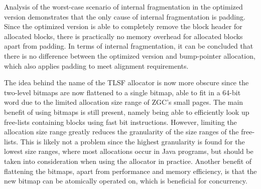 Analysis of the worst-case scenario of internal fragmentation in the optimized version demonstrates that the only cause of internal fragmentation is padding. Since the optimized version is able to completely remove the block header for allocated blocks, there is practically no memory overhead for allocated blocks apart from padding. In terms of internal fragmentation, it can be concluded that there is no difference between the optimized version and bump-pointer allocation, which also applies padding to meet alignment requirements.

The idea behind the name of the TLSF allocator is now more obscure since the two-level bitmaps are now flattened to a single bitmap, able to fit in a 64-bit word due to the limited allocation size range of ZGC's small pages. The main benefit of using bitmaps is still present, namely being able to efficiently look up free-lists containing blocks using fast bit instructions. However, limiting the allocation size range greatly reduces the granularity of the size ranges of the free-lists. This is likely not a problem since the highest granularity is found for the lowest size ranges, where most allocations occur in Java programs, but should be taken into consideration when using the allocator in practice. Another benefit of flattening the bitmaps, apart from performance and memory efficiency, is that the new bitmap can be atomically operated on, which is beneficial for concurrency.

